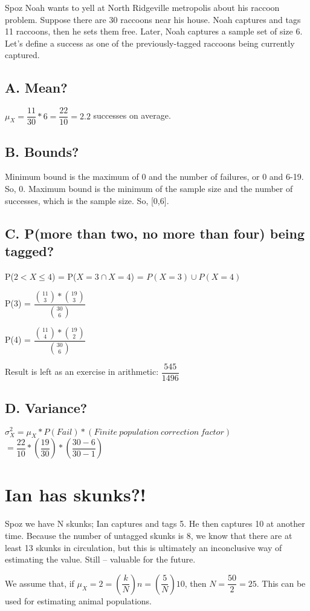 \documentclass[]{article}
\begin{document}
		Spoz Noah wants to yell at North Ridgeville metropolis about his raccoon problem. Suppose there are 30 raccoons near his house. Noah captures and tags 11 raccoons, then he sets them free. Later, Noah captures a sample set of size 6. Let's define a success as one of the previously-tagged raccoons being currently captured.
		
		\subsection{A. Mean?}
			$\mu_X = \dfrac{11}{30}*6 = \dfrac{22}{10} = 2.2$ successes on average.
		
		\subsection{B. Bounds?}
			Minimum bound is the maximum of 0 and the number of failures, or 0 and 6-19. So, 0. Maximum bound is the minimum of the sample size and the number of successes, which is the sample size. So, [0,6].
		
		\subsection{C. P(more than two, no more than four) being tagged?}
		
			P($2<X\leq 4$) = P($X=3 \cap X=4$) = $P(X=3) \cup P(X=4)$
			
			P(3) = $\dfrac{\binom{11}{3} * \binom{19}{3}}{\binom{30}{6}}$
			
			P(4) = $\dfrac{\binom{11}{4} * \binom{19}{2}}{\binom{30}{6}}$
			
			Result is left as an exercise in arithmetic: $\dfrac{545}{1496}$
		
		\subsection{D. Variance?}
			$\sigma_X^2 = \mu_X * P(Fail) * (Finite\ population\ correction\ factor)$
			$ = \dfrac{22}{10} * (\dfrac{19}{30}) * (\dfrac{30-6}{30-1})$
			
	\section{Ian has skunks?!}
		Spoz we have N skunks; Ian captures and tags 5. He then captures 10 at another time. Because the number of untagged skunks is 8, we know that there are at least 13 skunks in circulation, but this is ultimately an inconclusive way of estimating the value. Still -- valuable for the future.
		
		We assume that, if $\mu_X = 2 = (\dfrac{k}{N})n = (\dfrac{5}{N})10$, then $N = \dfrac{50}{2} = 25$. This can be used for estimating animal populations.
		
	
\end{document}
